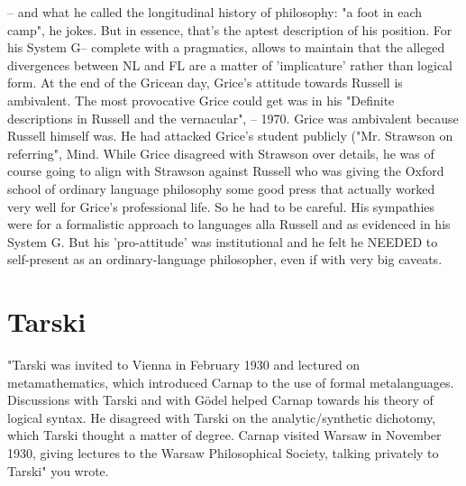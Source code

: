 \documentclass[10pt,titlepage]{book}
\begin{document}
{-- and  what he called the longitudinal history of philosophy: "a foot in 
each camp", he  jokes. But in essence, that's the aptest description of his 
position. For his  System G-- complete with a pragmatics, allows to maintain 
that the alleged  divergences between NL and FL are a matter of 
'implicature' rather than logical  form.  At the end of the Gricean  day, Grice's  
attitude towards Russell is ambivalent. The most  provocative Grice could  get 
was in his "Definite descriptions in Russell and the  
vernacular",  -- 1970. Grice was ambivalent because Russell himself was. He 
had attacked  Grice's student publicly ("Mr. Strawson on referring", Mind.  
While Grice  disagreed with Strawson over details, he was of course going 
to  align with  Strawson against Russell who was giving the Oxford school of 
ordinary   language philosophy some good press that actually worked very 
well for  Grice's  professional life. So he had to be careful. His sympathies 
were  for a  formalistic approach to languages alla Russell and as evidenced 
in  his System  G. But his 'pro-attitude' was institutional and he felt he  
NEEDED to  self-present as an ordinary-language philosopher, even if with  
very big  caveats. 

\section{Tarski}

"Tarski was invited to Vienna in February 1930 and lectured on  
metamathematics, which introduced Carnap to the use of formal metalanguages.  
Discussions with Tarski and with Gödel helped Carnap towards his theory of  logical 
syntax. He disagreed with Tarski on the analytic/synthetic dichotomy,  which 
Tarski thought a matter of degree. Carnap visited Warsaw in November 1930,  
giving lectures to the Warsaw Philosophical Society, talking privately to  
Tarski" you wrote.
  
}
\end{document}
